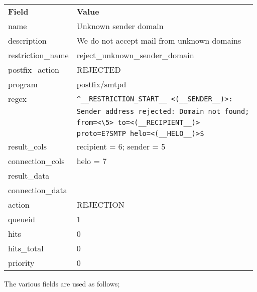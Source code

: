 \documentclass[a4paper,12pt,draft]{article}
\begin{document}
\begin{tabular}[]{ll}

\textbf{Field}      & \textbf{Value}                                    \\
name                & Unknown sender domain                             \\
description         & We do not accept mail from unknown domains        \\
restriction\_name   & reject\_unknown\_sender\_domain                   \\
postfix\_action     & REJECTED                                          \\
program             & postfix/smtpd                                     \\
regex               & \verb!^__RESTRICTION_START__ <(__SENDER__)>: !    \\
                    & \verb!Sender address rejected: Domain not found;! \\
                    & \verb!from=<\5> to=<(__RECIPIENT__)> !            \\
                    & \verb!proto=E?SMTP helo=<(__HELO__)>$!            \\
result\_cols        & recipient = 6; sender = 5                         \\
connection\_cols    & helo = 7                                          \\
result\_data        &                                                   \\
connection\_data    &                                                   \\
action              & REJECTION                                         \\
queueid             & 1                                                 \\
hits                & 0                                                 \\
hits\_total         & 0                                                 \\
priority            & 0                                                 \\

\end{tabular}

\vspace{1em}

The various fields are used as follows;
\end{document}
